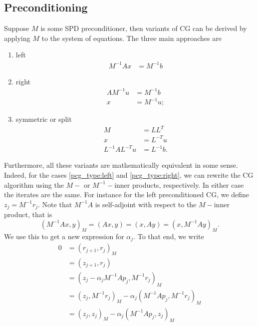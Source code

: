 \subsection{Preconditioning} \label{sec:cg_preconditioning}
Suppose $M$ is some SPD preconditioner, then variants of CG can be derived by applying $M$ to the system of equations. The three main approaches are
\begin{enumerate}[label=\roman*,ref=preconditioner-type \roman*]
  \item\label{pcg_type:left} left
  \begin{align*}
    M^{-1}Ax & = M^{-1}b
  \end{align*}
  \item\label{pcg_type:right} right
  \begin{align*}
    AM^{-1}u & = M^{-1}b  \\
    x        & = M^{-1}u;
  \end{align*}
  \item\label{pcg_type:symmetric} symmetric or split
  \begin{align*}
    M              & = LL^T     \\
    x              & = L^{-T}u  \\
    L^{-1}AL^{-T}u & = L^{-1}b.
  \end{align*}
\end{enumerate}
Furthermore, all these variants are mathematically equivalent in some sense. Indeed, for the cases \cref{pcg_type:left} and \cref{pcg_type:right}, we can rewrite the CG algorithm using the $M-$ or $M^{-1}-$inner products, respectively. In either case the iterates are the same. For instance for the left preconditioned CG, we define $z_j = M^{-1}r_j$. Note that $M^{-1}A$ is self-adjoint with respect to the $M-$inner product, that is
\[
  (M^{-1}Ax, y)_M = (Ax, y) = (x, Ay) = (x, M^{-1}Ay)_M.
\]
We use this to get a new expression for $\alpha_j$. To that end, we write
\begin{align*}
  0 & = (r_{j+1}, r_j)_M                                        \\
    & = (z_{j+1}, r_j)                                          \\
    & = (z_j - \alpha_j M^{-1}Ap_j, M^{-1}r_j)_M                \\
    & = (z_j, M^{-1}r_j)_M - \alpha_j (M^{-1}Ap_j, M^{-1}r_j)_M \\
    & = (z_j, z_j)_M - \alpha_j (M^{-1}Ap_j, z_j)_M             \\
\end{align*}
